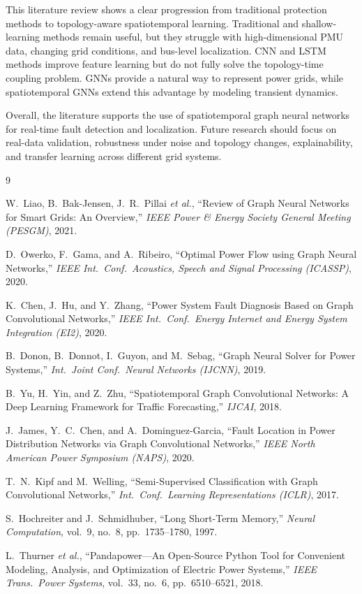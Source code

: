 \documentclass[12pt,a4paper]{article}
\begin{document}
This literature review shows a clear progression from traditional protection methods to topology-aware spatiotemporal learning. Traditional and shallow-learning methods remain useful, but they struggle with high-dimensional PMU data, changing grid conditions, and bus-level localization. CNN and LSTM methods improve feature learning but do not fully solve the topology-time coupling problem. GNNs provide a natural way to represent power grids, while spatiotemporal GNNs extend this advantage by modeling transient dynamics.

Overall, the literature supports the use of spatiotemporal graph neural networks for real-time fault detection and localization. Future research should focus on real-data validation, robustness under noise and topology changes, explainability, and transfer learning across different grid systems.

\begin{thebibliography}{9}

W.~Liao, B.~Bak-Jensen, J.~R.~Pillai \emph{et al.},
``Review of Graph Neural Networks for Smart Grids: An Overview,''
\emph{IEEE Power \& Energy Society General Meeting (PESGM)}, 2021.

D.~Owerko, F.~Gama, and A.~Ribeiro,
``Optimal Power Flow using Graph Neural Networks,''
\emph{IEEE Int.\ Conf.\ Acoustics, Speech and Signal Processing (ICASSP)}, 2020.

K.~Chen, J.~Hu, and Y.~Zhang,
``Power System Fault Diagnosis Based on Graph Convolutional Networks,''
\emph{IEEE Int.\ Conf.\ Energy Internet and Energy System Integration (EI2)}, 2020.

B.~Donon, B.~Donnot, I.~Guyon, and M.~Sebag,
``Graph Neural Solver for Power Systems,''
\emph{Int.\ Joint Conf.\ Neural Networks (IJCNN)}, 2019.

B.~Yu, H.~Yin, and Z.~Zhu,
``Spatiotemporal Graph Convolutional Networks: A Deep Learning Framework
for Traffic Forecasting,''
\emph{IJCAI}, 2018.

J.~James, Y.~C.~Chen, and A.~Dominguez-Garcia,
``Fault Location in Power Distribution Networks via Graph Convolutional Networks,''
\emph{IEEE North American Power Symposium (NAPS)}, 2020.

T.~N.~Kipf and M.~Welling,
``Semi-Supervised Classification with Graph Convolutional Networks,''
\emph{Int.\ Conf.\ Learning Representations (ICLR)}, 2017.

S.~Hochreiter and J.~Schmidhuber,
``Long Short-Term Memory,''
\emph{Neural Computation}, vol.~9, no.~8, pp.~1735--1780, 1997.

L.~Thurner \emph{et al.},
``Pandapower---An Open-Source Python Tool for Convenient Modeling, Analysis,
and Optimization of Electric Power Systems,''
\emph{IEEE Trans.\ Power Systems}, vol.~33, no.~6, pp.~6510--6521, 2018.

\end{thebibliography}
\end{document}
